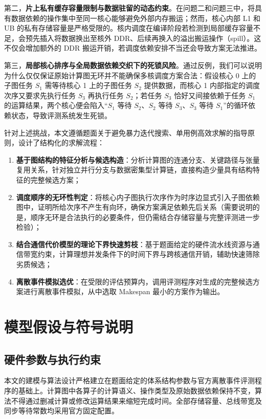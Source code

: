 \documentclass[anonymous,withtoc]{gmcm2026}
\providecommand{\tightlist}{\setlength{\itemsep}{0pt}\setlength{\parskip}{0pt}}
\begin{document}
第二，\textbf{片上私有缓存容量限制与数据驻留的动态约束}。在问题二和问题三中，将具有数据依赖的操作集中至同一核心能够避免外部内存搬运；然而，核心内部 L1 和 UB 的私有存储容量是严格受限的。核内调度在编译阶段若检测到局部缓存容量不足，会预先插入将数据换出至核外 DDR、后续再换入的溢出搬运操作（spill）。这不仅会增加额外的 DDR 搬运开销，若调度依赖安排不当还会导致方案无法推进。

第三，\textbf{局部核心排序与全局数据依赖交织下的死锁风险}。通过反例，我们可以说明为什么仅仅保证原始计算图无环并不能确保多核调度方案合法：假设核心 0 上的子图任务 \(S_1\) 需等待核心 1 上的子图任务 \(S_2\) 提供数据，而核心 1 内部指定的调度次序又要求先执行任务 \(S_3\) 再执行任务 \(S_2\)；若任务 \(S_3\) 恰好又间接依赖于任务 \(S_1\) 的运算结果，两个核心便会陷入``\(S_1\) 等待 \(S_2\)、\(S_2\) 等待 \(S_3\)、\(S_3\) 等待 \(S_1\)''的循环依赖状态，导致评测系统发生死锁。

针对上述挑战，本文遵循题面关于避免暴力迭代搜索、单用例高效求解的指导原则，设计了结构化的求解流程：

\begin{enumerate}
\def\labelenumi{\arabic{enumi}.}
\tightlist
\item
  \textbf{基于图结构的特征分析与候选构造}：分析计算图的连通分支、关键路径与张量复用关系，针对独立并行分支与数据密集型计算链，直接构造少量具有结构特征的完整候选方案；
\item
  \textbf{调度顺序的无环性判定}：将核心内子图执行次序作为时序边显式引入子图依赖图中，证明所给次序不产生有向环，确保方案满足依赖先后关系（需要说明的是，顺序无环是合法执行的必要条件，但仍需结合存储容量与完整评测进一步检验）；
\item
  \textbf{结合通信代价模型的理论下界快速剪枝}：基于题面给定的硬件流水线资源与通信带宽约束，计算理想并发条件下的时间下界与跨核通信开销，辅助快速筛除劣质候选；
\item
  \textbf{离散事件模拟选优}：在受限的评估预算内，调用评测程序对生成的完整候选方案进行离散事件模拟，从中选取 Makespan 最小的方案作为输出。
\end{enumerate}


\section{模型假设与符号说明}

\subsection{硬件参数与执行约束}

本文的建模与算法设计严格建立在题面给定的体系结构参数与官方离散事件评测程序的基础上。计算图中各算子的计算语义、操作类型及原始数据依赖保持不变，算法不得通过删减计算或修改运算结果来缩短完成时间。全部存储容量、总线带宽及同步等待常数均采用官方固定配置\cite{ref1}。
\end{document}
